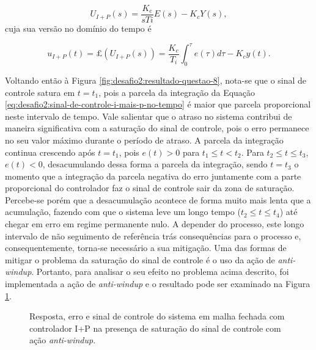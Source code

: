 \begin{equation}
    U_{I+P}(s) = \frac{K_{c}}{sTi}E(s) - K_{c}Y(s),
\end{equation}
cuja sua versão no domínio do tempo é

\begin{equation}
    \label{eq:desafio2:sinal-de-controle-i-mais-p-no-tempo}
    u_{I+P}(t) = \pounds( U_{I+P}(s)) = \frac{K_{c}}{T_{i}}\int_{0}^{\tau}e(\tau)d\tau - K_{c}y(t).
\end{equation}

Voltando então à Figura \ref{fig:desafio2:resultado-questao-8}, nota-se que o
sinal de controle satura em $t = t_{1}$, pois a parcela da integração da Equação
\ref{eq:desafio2:sinal-de-controle-i-mais-p-no-tempo} é maior que parcela
proporcional neste intervalo de tempo. Vale salientar que o atraso no sistema
contribui de maneira significativa com a saturação do sinal de controle, pois o
erro permanece no seu valor máximo durante o período de atraso. A parcela da
integração continua crescendo após $t = t_{1}$, pois $e(t) > 0$ para $t_{1} \le
t < t_{2}$. Para $t_{2} \le t \le t_{3}$, $e(t) < 0$, desacumulando dessa forma
a parcela da integração, sendo $t = t_{3}$ o momento que a integração da parcela
negativa do erro juntamente com a parte proporcional do controlador faz o sinal
de controle sair da zona de saturação. Percebe-se porém que a desacumulação
acontece de forma muito mais lenta que a acumulação, fazendo com que o sistema
leve um longo tempo ($t_{2} \le t \le t_{4}$) até chegar em erro em regime
permanente nulo. A depender do processo, este longo intervalo de não seguimento
de referência trás consequências para o processo e, consequentemente, torna-se
necessário a sua mitigação. Uma das formas de mitigar o problema da saturação do
sinal de controle é o uso da ação de \textit{anti-windup}. Portanto, para
analisar o seu efeito no problema acima descrito, foi implementada a ação de
\textit{anti-windup} e o resultado pode ser examinado na Figura
\ref{fig:desafio2:resultado-questao-9}.

\begin{figure}[!ht]
    \caption{Resposta, erro e sinal de controle do sistema em malha fechada com
    controlador I+P na presença de saturação do sinal de controle com ação
    \textit{anti-windup}.}
    \vspace{-10pt}
    \hspace{-30pt}
    \label{fig:desafio2:resultado-questao-9}
    \begin{minipage}{\linewidth}
        
    \end{minipage}
\end{figure}

